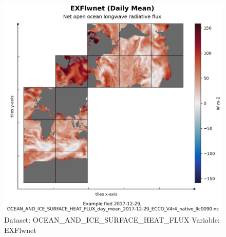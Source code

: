 \begin{figure}[H]
\centering
\includegraphics[width=\textwidth]{../images/plots/native_plots/Ocean_and_Sea-Ice_Surface_Heat_Fluxes/EXFlwnet.png}
\caption{Dataset: OCEAN\_AND\_ICE\_SURFACE\_HEAT\_FLUX Variable: EXFlwnet}
\label{tab:table-OCEAN_AND_ICE_SURFACE_HEAT_FLUX_EXFlwnet-Plot}
\end{figure}
\pagebreak
